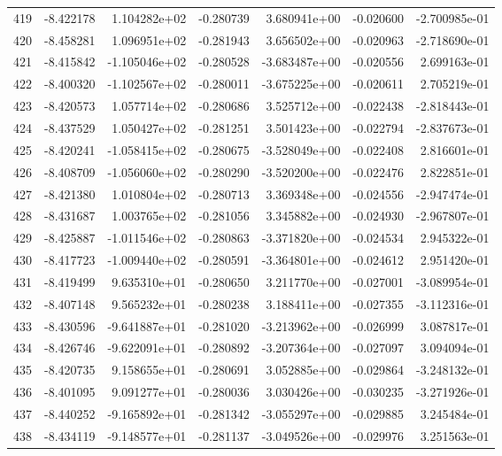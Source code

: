 \begin{tabular}{rrrrrrr}
 419 &  -8.422178 &  1.104282e+02 & -0.280739 &  3.680941e+00 &  -0.020600 & -2.700985e-01 \\
 420 &  -8.458281 &  1.096951e+02 & -0.281943 &  3.656502e+00 &  -0.020963 & -2.718690e-01 \\
 421 &  -8.415842 & -1.105046e+02 & -0.280528 & -3.683487e+00 &  -0.020556 &  2.699163e-01 \\
 422 &  -8.400320 & -1.102567e+02 & -0.280011 & -3.675225e+00 &  -0.020611 &  2.705219e-01 \\
 423 &  -8.420573 &  1.057714e+02 & -0.280686 &  3.525712e+00 &  -0.022438 & -2.818443e-01 \\
 424 &  -8.437529 &  1.050427e+02 & -0.281251 &  3.501423e+00 &  -0.022794 & -2.837673e-01 \\
 425 &  -8.420241 & -1.058415e+02 & -0.280675 & -3.528049e+00 &  -0.022408 &  2.816601e-01 \\
 426 &  -8.408709 & -1.056060e+02 & -0.280290 & -3.520200e+00 &  -0.022476 &  2.822851e-01 \\
 427 &  -8.421380 &  1.010804e+02 & -0.280713 &  3.369348e+00 &  -0.024556 & -2.947474e-01 \\
 428 &  -8.431687 &  1.003765e+02 & -0.281056 &  3.345882e+00 &  -0.024930 & -2.967807e-01 \\
 429 &  -8.425887 & -1.011546e+02 & -0.280863 & -3.371820e+00 &  -0.024534 &  2.945322e-01 \\
 430 &  -8.417723 & -1.009440e+02 & -0.280591 & -3.364801e+00 &  -0.024612 &  2.951420e-01 \\
 431 &  -8.419499 &  9.635310e+01 & -0.280650 &  3.211770e+00 &  -0.027001 & -3.089954e-01 \\
 432 &  -8.407148 &  9.565232e+01 & -0.280238 &  3.188411e+00 &  -0.027355 & -3.112316e-01 \\
 433 &  -8.430596 & -9.641887e+01 & -0.281020 & -3.213962e+00 &  -0.026999 &  3.087817e-01 \\
 434 &  -8.426746 & -9.622091e+01 & -0.280892 & -3.207364e+00 &  -0.027097 &  3.094094e-01 \\
 435 &  -8.420735 &  9.158655e+01 & -0.280691 &  3.052885e+00 &  -0.029864 & -3.248132e-01 \\
 436 &  -8.401095 &  9.091277e+01 & -0.280036 &  3.030426e+00 &  -0.030235 & -3.271926e-01 \\
 437 &  -8.440252 & -9.165892e+01 & -0.281342 & -3.055297e+00 &  -0.029885 &  3.245484e-01 \\
 438 &  -8.434119 & -9.148577e+01 & -0.281137 & -3.049526e+00 &  -0.029976 &  3.251563e-01 \\

\end{tabular}
